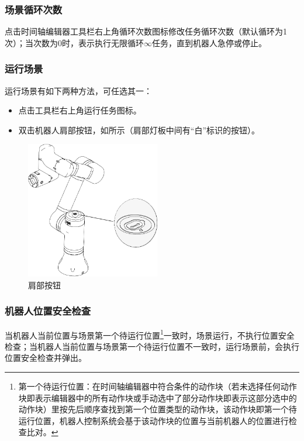 



\subsubsection{场景循环次数}
点击时间轴编辑器工具栏右上角循环次数图标修改任务循环次数（默认循环为1次）；当次数为0时，表示执行无限循环$\infty$任务，直到机器人急停或停止。


\subsubsection{运行场景}
\label{sec:运行场景}
运行场景有如下两种方法，可任选其一：
\begin{itemize}
	\item 点击工具栏右上角运行任务图标。
	\item 双击机器人肩部按钮，如所示（肩部灯板中间有“白”标识的按钮）。
\end{itemize}


\begin{figure}[ht]
	\centering
	\includegraphics[height=6cm]{line_graphs/shoulder_btn.pdf}
	\caption{肩部按钮}
	\label{fig:肩部按钮示意图}
\end{figure}

\subsubsection{机器人位置安全检查}
当机器人当前位置与场景第一个待运行位置\footnote{第一个待运行位置：在时间轴编辑器中符合条件的动作块（若未选择任何动作块即表示编辑器中的所有动作块或手动选中了部分动作块即表示这部分选中的动作块）里按先后顺序查找到第一个位置类型的动作块，该动作块即第一个待运行位置，机器人控制系统会基于该动作块的位置与当前机器人的位置进行检查比对。}一致时，场景运行，不执行位置安全检查；当机器人当前位置与场景第一个待运行位置不一致时，运行场景前，会执行位置安全检查并弹出。

